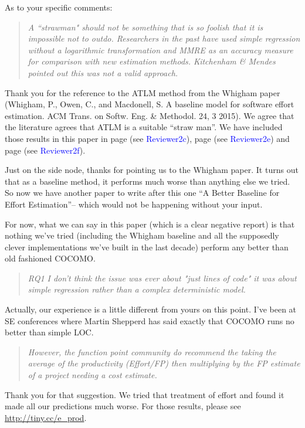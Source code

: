 \documentclass[smallcondesed]{svjour3}
\newcommand{\WHERE}[1]{page \pageref{err:#1} (see \textcolor{blue}{#1})}
\begin{document}
As to your specific comments:

\begin{quote}{\em A ``strawman" should not be something that is so
  foolish that it is impossible not to
  outdo. Researchers in the past have used simple
  regression without a logarithmic transformation
  and MMRE as an accuracy measure for comparison
  with new estimation methods.  Kitchenham \& Mendes
  pointed out this was not a valid approach.}\end{quote}

Thank you for the reference to the ATLM method from
the Whigham paper (Whigham, P., Owen, C., and
Macdonell, S. A baseline model for software effort
estimation. ACM Trans. on Softw. Eng. \&
Methodol. 24, 3 2015). We agree that the literature
agrees that ATLM is a suitable ``straw man''. We
have included those results in this paper in
\WHERE{Reviewer2c}, \WHERE{Reviewer2e} and \WHERE{Reviewer2f}.

Just on the side node, thanks for pointing us to
the  Whigham paper. It turns out that  as a baseline method,
it performs much worse than anything else we tried. So now we have another paper
to write after this one ``A Better Baseline for Effort Estimation''-- which would
not be happening without your input.

For now, what we can say in this paper (which is a clear negative report) is
that nothing we've tried (including the Whigham baseline and
all the supposedly clever implementations
we've built in the last decade) perform any better than old fashioned COCOMO.

\begin{quote}{\em RQ1 I don't think the issue was ever about "just lines of code" it was about simple regression rather than a complex  deterministic model. }\end{quote}

Actually, our experience is a little different from yours on this point.
I've been at SE conferences where Martin Shepperd  has said exactly that COCOMO
runs no better than simple LOC.

\begin{quote}{\em However,  the function point community do recommend the taking the average of the productivity (Effort/FP) then multiplying by the FP estimate of a project needing a cost estimate.}\end{quote}

Thank you for that suggestion. We tried that treatment of  effort
and found it made all our predictions much worse. For those results,
please  see \url{http://tiny.cc/e_prod}.  
\end{document}
